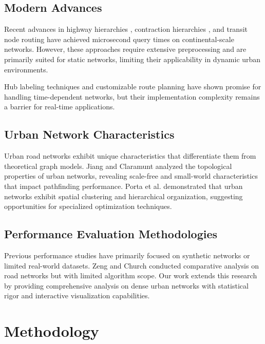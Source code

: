 \documentclass[conference]{IEEEtran}
\begin{document}
\subsection{Modern Advances}

Recent advances in highway hierarchies \cite{sanders2005highway}, contraction hierarchies \cite{geisberger2008contraction}, and transit node routing \cite{bast2007fast} have achieved microsecond query times on continental-scale networks. However, these approaches require extensive preprocessing and are primarily suited for static networks, limiting their applicability in dynamic urban environments.

Hub labeling techniques \cite{abraham2011hub} and customizable route planning \cite{dibbelt2016customizable} have shown promise for handling time-dependent networks, but their implementation complexity remains a barrier for real-time applications.

\subsection{Urban Network Characteristics}

Urban road networks exhibit unique characteristics that differentiate them from theoretical graph models. Jiang and Claramunt \cite{jiang2004topological} analyzed the topological properties of urban networks, revealing scale-free and small-world characteristics that impact pathfinding performance. Porta et al. \cite{porta2006network} demonstrated that urban networks exhibit spatial clustering and hierarchical organization, suggesting opportunities for specialized optimization techniques.

\subsection{Performance Evaluation Methodologies}

Previous performance studies have primarily focused on synthetic networks or limited real-world datasets. Zeng and Church \cite{zeng2012comparative} conducted comparative analysis on road networks but with limited algorithm scope. Our work extends this research by providing comprehensive analysis on dense urban networks with statistical rigor and interactive visualization capabilities.

\section{Methodology}
\end{document}
